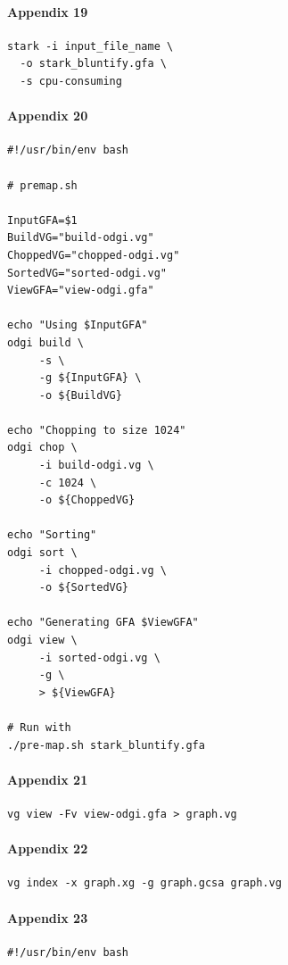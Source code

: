 \documentclass[10pt, a4paper]{article}
\begin{document}
\begin{appendices}
\paragraph{Appendix 19}
\label{sec:org80ab42f}
\begin{verbatim}
stark -i input_file_name \
  -o stark_bluntify.gfa \
  -s cpu-consuming
\end{verbatim}

\paragraph{Appendix 20}
\label{sec:org2359f0b}
\begin{verbatim}
#!/usr/bin/env bash

# premap.sh

InputGFA=$1
BuildVG="build-odgi.vg"
ChoppedVG="chopped-odgi.vg"
SortedVG="sorted-odgi.vg"
ViewGFA="view-odgi.gfa"

echo "Using $InputGFA"
odgi build \
     -s \
     -g ${InputGFA} \
     -o ${BuildVG}

echo "Chopping to size 1024"
odgi chop \
     -i build-odgi.vg \
     -c 1024 \
     -o ${ChoppedVG}

echo "Sorting"
odgi sort \
     -i chopped-odgi.vg \
     -o ${SortedVG}

echo "Generating GFA $ViewGFA"
odgi view \
     -i sorted-odgi.vg \
     -g \
     > ${ViewGFA}

# Run with
./pre-map.sh stark_bluntify.gfa
\end{verbatim}

\paragraph{Appendix 21}
\label{sec:orgc3d86f9}
\begin{verbatim}
vg view -Fv view-odgi.gfa > graph.vg
\end{verbatim}

\paragraph{Appendix 22}
\label{sec:org9b4fa70}
\begin{verbatim}
vg index -x graph.xg -g graph.gcsa graph.vg
\end{verbatim}

\paragraph{Appendix 23}
\label{sec:org2111fdb}
\begin{verbatim}
#!/usr/bin/env bash


\end{verbatim}
\end{appendices}
\end{document}
